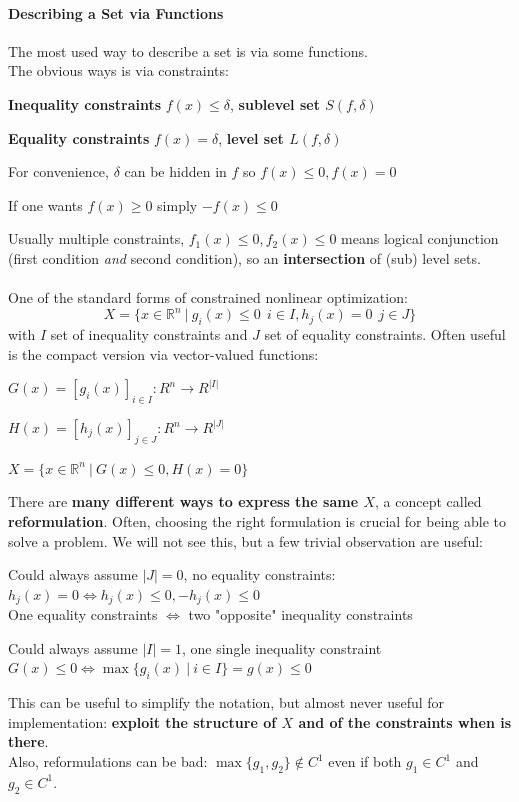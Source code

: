 \documentclass[10pt]{report}
\begin{document}
\paragraph{Describing a Set via Functions} The most used way to describe a set is via some functions.\\
The obvious ways is via constraints:
\begin{list}{}{}
	\item \textbf{Inequality constraints} $f(x)\leq\delta$, \textbf{sublevel set $S(f,\delta)$}
	\item \textbf{Equality constraints} $f(x)=\delta$, \textbf{level set $L(f,\delta)$}
	\item For convenience, $\delta$ can be hidden in $f$ so $f(x)\leq0,f(x)=0$
	\item If one wants $f(x)\geq 0$ simply $-f(x)\leq 0$
\end{list}
Usually multiple constraints, $f_1(x)\leq 0, f_2(x)\leq 0$ means logical conjunction (first condition \textit{and} second condition), so an \textbf{intersection} of (sub) level sets.\\\\
One of the standard forms of constrained nonlinear optimization:
$$X=\{x\in \mathbb{R}^n\:|\:g_i(x)\leq 0\:\:i\in I, h_j(x)=0\:\:j\in J\}$$
with $I$ set of inequality constraints and $J$ set of equality constraints. Often useful is the compact version via vector-valued functions:
\begin{list}{}{}
	\item $G(x) = [g_i(x)]_{i\in I} : R^n\rightarrow R^{|I|}$
	\item $H(x) = [h_j(x)]_{j\in J} : R^n\rightarrow R^{|J|}$
	\item $X=\{x\in \mathbb{R}^n\:|\:G(x)\leq 0, H(x) = 0\}$
\end{list}
There are \textbf{many different ways to express the same $X$}, a concept called \textbf{reformulation}. Often, choosing the right formulation is crucial for being able to solve a problem. We will not see this, but a few trivial observation are useful:
\begin{list}{}{}
	\item Could always assume $|J|=0$, no equality constraints: $h_j(x) = 0\Leftrightarrow h_j(x)\leq 0, -h_j(x)\leq 0$\\
	One equality constraints $\Leftrightarrow$ two "opposite" inequality constraints
	\item Could always assume $|I|=1$, one single inequality constraint\\
	$G(x)\leq 0\Leftrightarrow \max\{g_i(x)\:|\:i\in I\} = g(x)\leq 0$
\end{list}
This can be useful to simplify the notation, but almost never useful for implementation: \textbf{exploit the structure of $X$ and of the constraints when is there}.\\
Also, reformulations can be bad: $\max\{g_1,g_2\}\not\in C^1$ even if both $g_1\in C^1$ and $g_2\in C^1$.
\end{document}
